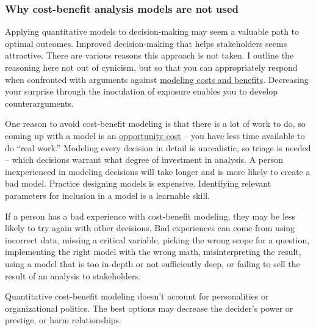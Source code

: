 \subsubsection*{Why cost-benefit analysis models are not used}

Applying quantitative models to decision-making may seem a valuable path to optimal outcomes. Improved decision-making that helps stakeholders seems attractive. There are various reasons this approach is not taken. I outline the reasoning here not out of cynicism, but so that you can appropriately respond when confronted with arguments against \href{https://en.wikipedia.org/wiki/Cost\%E2\%80\%93benefit_analysis}{modeling costs and benefits}.\iftoggle{WPinmargin}{\marginpar{$>$Wikipedia: cost-benefit modeling}}{}
Decreasing your surprise through the inoculation of exposure enables you to develop counterarguments. 

One reason to avoid cost-benefit modeling is that there is a lot of work to do, so coming up with a model is an \href{https://en.wikipedia.org/wiki/Opportunity_cost}{opportunity cost} -- you have less time available to do ``real work.'' 
\iftoggle{WPinmargin}{\marginpar{$>$Wikipedia: opportunity cost}}{}
Modeling every decision in detail is unrealistic, so triage is needed -- which decisions warrant what degree of investment in analysis. A person inexperienced in modeling decisions will take longer and is more likely to create a bad model. Practice designing models is expensive. Identifying relevant parameters for inclusion in a model is a learnable skill. 

If a person has a bad experience with cost-benefit modeling, they may be less likely to try again with other decisions. Bad experiences can come from using incorrect data, missing a critical variable, picking the wrong scope for a question, implementing the right model with the wrong math, misinterpreting the result, using a model that is too in-depth or not sufficiently deep, or failing to sell the result of an analysis to stakeholders.

Quantitative cost-benefit modeling doesn't account for personalities or organizational politics. The best options may decrease the decider's power or prestige, or harm relationships. 

